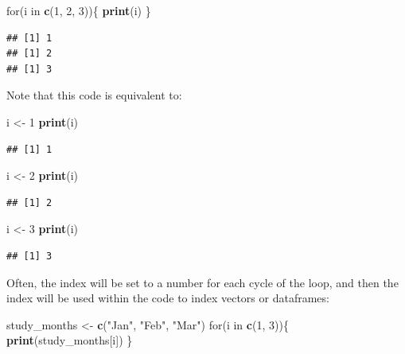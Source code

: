 \documentclass[]{book}
\makeatletter
\newenvironment{Shaded}{\begin{snugshade}}{\end{snugshade}}
\newcommand{\KeywordTok}[1]{\textcolor[rgb]{0.13,0.29,0.53}{\textbf{{#1}}}}
\newcommand{\DecValTok}[1]{\textcolor[rgb]{0.00,0.00,0.81}{{#1}}}
\newcommand{\StringTok}[1]{\textcolor[rgb]{0.31,0.60,0.02}{{#1}}}
\newcommand{\NormalTok}[1]{{#1}}
\newenvironment{kframe}{%
\medskip{}
\setlength{\fboxsep}{.8em}
 \def\at@end@of@kframe{}%
 \ifinner\ifhmode%
  \def\at@end@of@kframe{\end{minipage}}%
  \begin{minipage}{\columnwidth}%
 \fi\fi%
 \def\FrameCommand##1{\hskip\@totalleftmargin \hskip-\fboxsep
 \colorbox{shadecolor}{##1}\hskip-\fboxsep
     \hskip-\linewidth \hskip-\@totalleftmargin \hskip\columnwidth}%
 \MakeFramed {\advance\hsize-\width
   \@totalleftmargin\z@ \linewidth\hsize
   \@setminipage}}%
 {\par\unskip\endMakeFramed%
 \at@end@of@kframe}
\renewenvironment{Shaded}{\begin{kframe}}{\end{kframe}}
\makeatother
\begin{document}
\begin{Shaded}
\begin{Highlighting}[]
\NormalTok{for(i in }\KeywordTok{c}\NormalTok{(}\DecValTok{1}\NormalTok{, }\DecValTok{2}\NormalTok{, }\DecValTok{3}\NormalTok{))\{}
        \KeywordTok{print}\NormalTok{(i)}
\NormalTok{\}}
\end{Highlighting}
\end{Shaded}

\begin{verbatim}
## [1] 1
## [1] 2
## [1] 3
\end{verbatim}

Note that this code is equivalent to:

\begin{Shaded}
\begin{Highlighting}[]
\NormalTok{i <-}\StringTok{ }\DecValTok{1}
\KeywordTok{print}\NormalTok{(i)}
\end{Highlighting}
\end{Shaded}

\begin{verbatim}
## [1] 1
\end{verbatim}

\begin{Shaded}
\begin{Highlighting}[]
\NormalTok{i <-}\StringTok{ }\DecValTok{2}
\KeywordTok{print}\NormalTok{(i)}
\end{Highlighting}
\end{Shaded}

\begin{verbatim}
## [1] 2
\end{verbatim}

\begin{Shaded}
\begin{Highlighting}[]
\NormalTok{i <-}\StringTok{ }\DecValTok{3}
\KeywordTok{print}\NormalTok{(i)}
\end{Highlighting}
\end{Shaded}

\begin{verbatim}
## [1] 3
\end{verbatim}

Often, the index will be set to a number for each cycle of the loop, and
then the index will be used within the code to index vectors or
dataframes:

\begin{Shaded}
\begin{Highlighting}[]
\NormalTok{study_months <-}\StringTok{ }\KeywordTok{c}\NormalTok{(}\StringTok{"Jan"}\NormalTok{, }\StringTok{"Feb"}\NormalTok{, }\StringTok{"Mar"}\NormalTok{)}
\NormalTok{for(i in }\KeywordTok{c}\NormalTok{(}\DecValTok{1}\NormalTok{, }\DecValTok{3}\NormalTok{))\{}
        \KeywordTok{print}\NormalTok{(study_months[i])}
\NormalTok{\}}
\end{Highlighting}
\end{Shaded}
\end{document}
